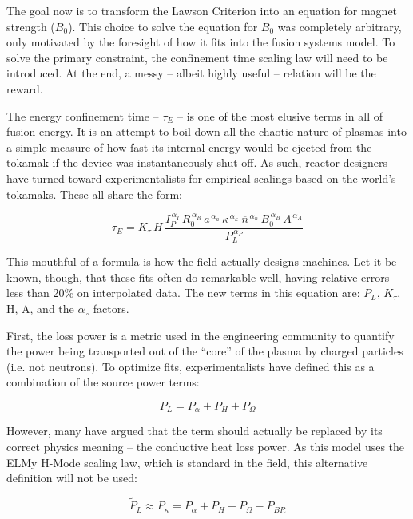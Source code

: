 The goal now is to transform the Lawson Criterion into an equation for magnet strength ($B_0$). This choice to solve the equation for $B_0$ was completely arbitrary, only motivated by the foresight of how it fits into the fusion systems model. To solve the primary constraint, the confinement time scaling law will need to be introduced. At the end, a messy -- albeit highly useful -- relation will be the reward.

The energy confinement time -- $\tau_E$ -- is one of the most elusive terms in all of fusion energy. It is an attempt to boil down all the chaotic nature of plasmas into a simple measure of how fast its internal energy would be ejected from the tokamak if the device was instantaneously shut off. As such, reactor designers have turned toward experimentalists for empirical scalings based on the world's tokamaks. These all share the form:

\begin{equation}
	\tau_E = K_\tau \, H \, \frac{
		I_P^{\,\alpha_I} \, R_0^{\,\alpha_R} \, a^{\,\alpha_a} \, \kappa^{\,\alpha_\kappa} \ \overline{n}^{\,\alpha_n} \, B_0^{\,\alpha_B} \, A^{\,\alpha_A}
	}{ P_L ^ {\,\alpha_P} }
\end{equation}

This mouthful of a formula is how the field actually designs machines. Let it be known, though, that these fits often do remarkable well, having relative errors less than 20\% on interpolated data. The new terms in this equation are: $P_L$, $K_\tau$, H, A, and the $\alpha_{\,\square}$ factors. 

First, the loss power is a metric used in the engineering community to quantify the power being transported out of the ``core'' of the plasma by charged particles (i.e. not neutrons). \cite{process} To optimize fits, experimentalists have defined this as a combination of the source power terms:

\begin{equation}
	\label{eq:pl}
	P_L = P_\alpha + P_H + P_\Omega
\end{equation}

However, many have argued that the term should actually be replaced by its correct physics meaning -- the conductive heat loss power. As this model uses the ELMy H-Mode scaling law, which is standard in the field, this alternative definition will not be used:

\begin{equation}
	\tilde P_L \approx P_\kappa = P_\alpha + P_H + P_\Omega - P_{BR}
\end{equation}

